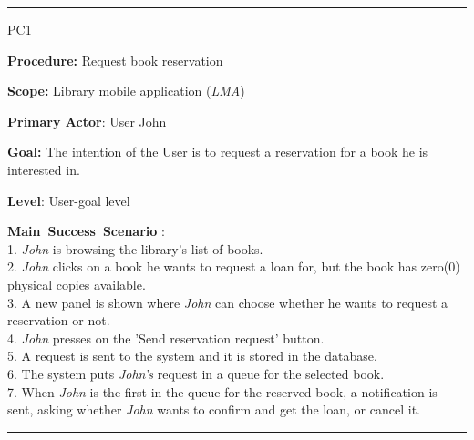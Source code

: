 \vspace{0.5cm}
\hrule
\begin{lyxlist}{PC1}
\small{
\item [\textbf{Procedure:}] Request book reservation
\item [\textbf{Scope:}] Library mobile application (\emph{LMA})
\item [\textbf{Primary Actor}:] User John
\item [\textbf{Goal:}] The intention of the User is to request a reservation for
a book he is interested in.
\item [\textbf{Level}:] User-goal level
\item [\textbf{Main~Success~Scenario}]:\\
1. \emph{John} is browsing the library's list of books. \\
2. \emph{John} clicks on a book he wants to request a loan for, but the book has
zero(0) physical copies available.\\
3. A new panel is shown where \emph{John} can choose whether he wants to
request a reservation or not. \\
4. \emph{John} presses on the 'Send reservation request' button. \\
5. A request is sent to the system and it is stored in the database. \\
6. The system puts \emph{John's} request in a queue for the selected book. \\ 
7. When \emph{John} is the first in the queue for the reserved book, a
notification is sent, asking whether \emph{John} wants to confirm and get the
loan, or cancel it. \\

}
\end{lyxlist}
\hrule


